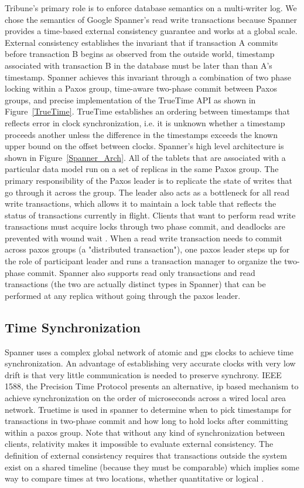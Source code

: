 \documentclass[10pt,twocolumn]{article}
\begin{document}
Tribune's primary role is to enforce database semantics on a multi-writer log. We chose the semantics of Google Spanner's read write transactions \cite{corbett_spanner:_2012} because Spanner provides a time-based external consistency guarantee and works at a global scale. External consistency establishes the invariant that if transaction A commits before transaction B begins as observed from the outside world, timestamp associated with transaction B in the database must be later than than A's timestamp. Spanner achieves this invariant through a combination of two phase locking within a Paxos group, time-aware two-phase commit between Paxos groups, and precise implementation of the TrueTime API as shown in Figure~\ref{TrueTime}. TrueTime establishes an ordering between timestamps that reflects error in clock synchronization, i.e. it is unknown whether a timestamp proceeds another unless the difference in the timestamps exceeds the known upper bound on the offset between clocks.
Spanner's high level architecture is shown in Figure~\ref{Spanner_Arch}. All of the tablets that are associated with a particular data model run on a set of replicas in the same Paxos group. The primary responsibility of the Paxos leader is to replicate the state of writes that go through it across the group. The leader also acts as a bottleneck for all read write transactions, which allows it to maintain a lock table that reflects the status of transactions currently in flight. Clients that want to perform read write transactions must acquire locks through two phase commit, and deadlocks are prevented with wound wait \cite{wound_wait}. When a read write transaction needs to commit across paxos groups (a "distributed transaction"), one paxos leader steps up for the role of participant leader and runs a transaction manager to organize the two-phase commit. Spanner also supports read only transactions and read transactions (the two are actually distinct types in Spanner) that can be performed at any replica without going through the paxos leader.


\subsection{Time Synchronization}
Spanner uses a complex global network of atomic and gps clocks to achieve time synchronization. An advantage of establishing very accurate clocks with very low drift is that very little communication is needed to preserve synchrony. IEEE 1588, the Precision Time Protocol \cite{ratzel_toward_2012} presents an alternative, ip based mechanism to achieve synchronization on the order of microseconds across a wired local area network. Truetime is used in spanner to determine when to pick timestamps for transactions in two-phase commit and how long to hold locks after committing within a paxos group.  Note that without any kind of synchronization between clients, relativity makes it impossible to evaluate external consistency. The definition of external consistency requires that transactions outside the system exist on a shared timeline (because they must be comparable) which implies some way to compare times at two locations, whether quantitative or logical \cite{lamport_time_1978}.
\end{document}
